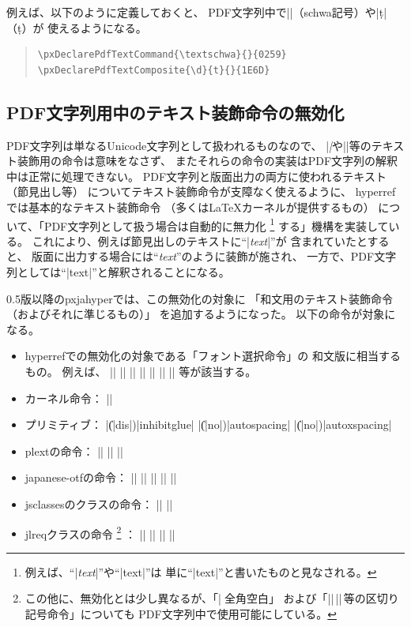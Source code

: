 \documentclass[uplatex,dvipdfmx,a4paper]{jsarticle}
\newcommand{\Pkg}[1]{\textsf{#1}}
\newcommand{\Means}{：\quad}
\newcommand{\／}{\mbox{}／\mbox{}}
\begin{document}
例えば、以下のように定義しておくと、
PDF文字列中で|\textschwa|（schwa記号）や|\d{t}|（\d{t}）が
使えるようになる。
\begin{quote}\small\begin{verbatim}
\pxDeclarePdfTextCommand{\textschwa}{}{0259}
\pxDeclarePdfTextComposite{\d}{t}{}{1E6D}
\end{verbatim}\end{quote}

\subsection{PDF文字列用中のテキスト装飾命令の無効化}
\label{ssec:disablecmds}

PDF文字列は単なるUnicode文字列として扱われるものなので、
|\textit|や|\large|等のテキスト装飾用の命令は意味をなさず、
またそれらの命令の実装はPDF文字列の解釈中は正常に処理できない。
PDF文字列と版面出力の両方に使われるテキスト（節見出し等）
についてテキスト装飾命令が支障なく使えるように、
\Pkg{hyperref}では基本的なテキスト装飾命令
（多くは{\LaTeX}カーネルが提供するもの）
について、「PDF文字列として扱う場合は自動的に無力化
\footnote{例えば、“|\textit{text}|”や“|{\large text}|”は
  単に“|text|”と書いたものと見なされる。}
する」機構を実装している。
これにより、例えば節見出しのテキストに“|\textit{text}|”が
含まれていたとすると、
版面に出力する場合には“\textit{text}”のように装飾が施され、
一方で、PDF文字列としては“|text|”と解釈されることになる。

0.5版以降の\Pkg{pxjahyper}では、この無効化の対象に
「和文用のテキスト装飾命令（およびそれに準じるもの）」
を追加するようになった。
以下の命令が対象になる。

\begin{itemize}
\item \Pkg{hyperref}での無効化の対象である「フォント選択命令」の
  和文版に相当するもの。
  例えば、
  |\textmc| |\gtfamily| |\kanjifamily| |\romanshape|
  |\usekanji| |\useroman| |\userelfont|
  等が該当する。
\item {\pLaTeX}カーネル命令\Means
  |\<|
\item {\pTeX}プリミティブ\Means
  |\|(|dis|)|inhibitglue| |\|(|no|)|autospacing| |\|(|no|)|autoxspacing|
\item \Pkg{plext}の命令\Means
  |\bou| |\kasen| |\rensuji|
\item \Pkg{japanese-otf}の命令\Means
  |\textmg| |\mgfamily| |\ltseries| |\ebseries| |\propshape|
\item \Pkg{jsclasses}のクラスの命令\Means
  |\maybeblue| |\HUGE|
\item \Pkg{jlreq}クラスの命令%
  \footnote{この他に、無効化とは少し異なるが、「|\|＋全角空白」
    および「|\？|\,|\！|\,等の区切り記号命令」についても
    PDF文字列中で使用可能にしている。}%
\Means
  |\jafontsize| |\tatechuyoko| |\jidori| |\akigumi| %
\end{itemize}
\end{document}
